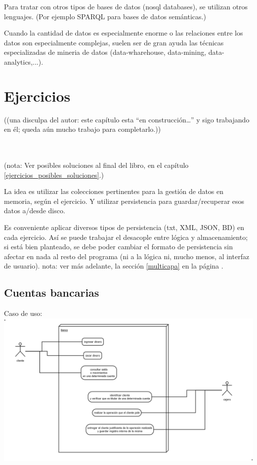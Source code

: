 \documentclass[spanish,12pt,a4paper,final,oneside]{book}
\begin{document}
Para tratar con otros tipos de bases de datos (nosql databases), se utilizan otros lenguajes. (Por ejemplo SPARQL para bases de datos semánticas.)

Cuando la cantidad de datos es especialmente enorme o las relaciones entre los datos son especialmente complejas, suelen ser de gran ayuda las técnicas especializadas de mineria de datos (data-wharehouse, data-mining, data-analytics,...).


\chapter{Ejercicios}\label{ejercicios_datos}

\begin{footnotesize}((una disculpa del autor: este capítulo esta ``en construcción\ldots'' y sigo trabajando en él; queda aún mucho trabajo para completarlo.))\end{footnotesize}
\\
\\

(nota: Ver posibles soluciones al final del libro, en el capítulo \ref{ejercicios_posibles_soluciones}.)

La idea es utilizar las colecciones pertinentes para la gestión de datos en memoria, según el ejercicio. Y utilizar persistencia para guardar/recuperar esos datos a/desde disco.

Es conveniente aplicar diversos tipos de persistencia (txt, XML, JSON, BD) en cada ejercicio. Así se puede trabajar el desacople entre lógica y almacenamiento; si está bien planteado, se debe poder cambiar el formato de persistencia sin afectar en nada al resto del programa (ni a la lógica ni, mucho menos, al interfaz de usuario). nota: ver más adelante, la sección \ref{multicapa} en la página \pageref{multicapa}.

\section{Cuentas bancarias}\label{ejercicio_cuentasbancarias}

Caso de uso:\\
\includegraphics[width=\textwidth]{cuentas bancarias - caso de uso} 
\end{document}

